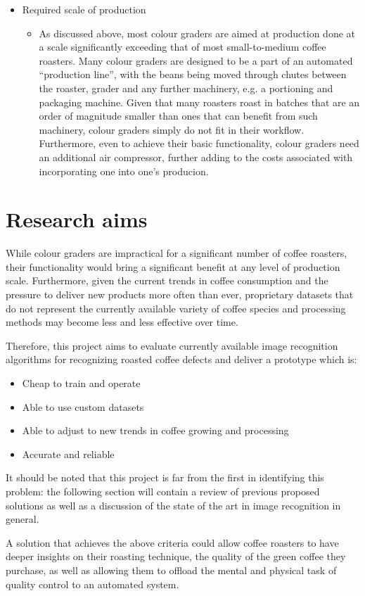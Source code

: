 \begin{itemize}
	\item Required scale of production
		\begin{itemize}
			\item As discussed above, most colour graders are aimed at production done
				at a scale significantly exceeding that of most small-to-medium coffee
				roasters. Many colour graders are designed to be a part of an automated ``production
				line'', with the beans being moved through chutes between the roaster, grader
				and any further machinery, e.g. a portioning and packaging machine.
				Given that many roasters roast in batches that are an order of magnitude
				smaller than ones that can benefit from such machinery, colour graders simply
				do not fit in their workflow. Furthermore, even to achieve their basic functionality,
				colour graders need an additional air compressor, further adding to the costs
				associated with incorporating one into one's producion.
		\end{itemize}
\end{itemize}

\section{Research aims}
\label{sec:research-aims} While colour graders are impractical for a significant
number of coffee roasters, their functionality would bring a significant benefit
at any level of production scale. Furthermore, given the current trends in coffee
consumption and the pressure to deliver new products more often than ever,
proprietary datasets that do not represent the currently available variety of
coffee species and processing methods may become less and less effective over
time.

Therefore, this project aims to evaluate currently available image recognition algorithms
for recognizing roasted coffee defects and deliver a prototype which is:
\begin{itemize}
	\item Cheap to train and operate

	\item Able to use custom datasets

	\item Able to adjust to new trends in coffee growing and processing

	\item Accurate and reliable
\end{itemize}

It should be noted that this project is far from the first in identifying this problem:
the following section will contain a review of previous proposed solutions as
well as a discussion of the state of the art in image recognition in general.

A solution that achieves the above criteria could allow coffee roasters to have
deeper insights on their roasting technique, the quality of the green coffee they
purchase, as well as allowing them to offload the mental and physical task of
quality control to an automated system.